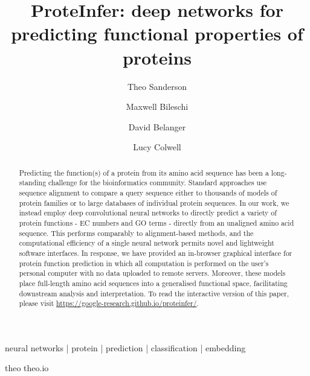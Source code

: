\title{ProteInfer: deep networks for predicting functional properties of proteins}
\author[*,1,\Letter]{Theo Sanderson}
\author[*,2]{Maxwell Bileschi}
\author[2]{David Belanger}
\author[2]{Lucy Colwell}




\maketitle



\begin{abstract}
Predicting the function(s) of a protein from its amino acid sequence has been a long-standing challenge for the bioinformatics community. Standard approaches use sequence alignment to compare a query sequence either to thousands of models of protein families or to large databases of individual protein sequences. In our work, we instead employ deep convolutional neural networks to directly predict a variety of protein functions - EC numbers and GO terms - directly from an unaligned amino acid sequence. This performs comparably to alignment-based methods, and the computational efficiency of a single neural network permits novel and lightweight software interfaces. In response, we have provided an in-browser graphical interface for protein function prediction in which all computation is performed on the user's personal computer with no data uploaded to remote servers. Moreover, these models place full-length amino acid sequences into a generalised functional space, facilitating downstream analysis and interpretation. To read the interactive version of this paper, please visit \url{https://google-research.github.io/proteinfer/}.
\end {abstract}

\begin{keywords}
neural networks | protein | prediction | classification | embedding
\end{keywords}

\begin{corrauthor}
theo \at \;theo.io
\end{corrauthor}

